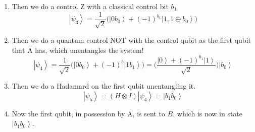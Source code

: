 \documentclass{article}
\newcommand{\ket}[1]{\ensuremath{\left|#1\right\rangle}}
\begin{document}
\begin{theorem}
\begin{enumerate}
        \item Then we do a control Z with a classical control bit $b_1$
          \begin{equation} 
            \ket{\psi_3} = \frac{1}{\sqrt{2}} \big( \ket{0 b_0} + (-1)^{b_1} \ket{1, 1 \oplus b_0} \big)
          \end{equation}
        \item Then we do a quantum control NOT with the control qubit as the first qubit that A has, which unentangles the system! 
          \begin{equation} 
            \ket{\psi_4} = \frac{1}{\sqrt{2}} \big( \ket{0 b_0} + (-1)^b \ket{1 b_1} \big) = \bigg( \frac{\ket{0} + (-1)^{b_1} \ket{1}}{\sqrt{2}} \bigg) \ket{b_0} 
          \end{equation}
        \item Then we do a Hadamard on the first qubit unentangling it. 
          \begin{equation} 
            \ket{\psi_5} = (H \otimes I) \ket{\psi_4} = \ket{b_1 b_0} 
          \end{equation}
        \item Now the first qubit, in possession by A, is sent to $B$, which is now in state $\ket{b_1 b_0}$. 
      \end{enumerate}
    \end{theorem}
\end{document}
